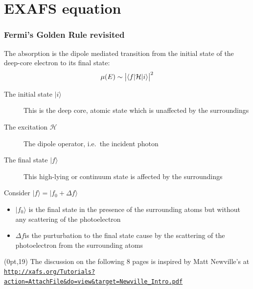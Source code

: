 \documentclass[10pt, xcolor=x11names, compress]{beamer}
\begin{document}
% 
% 


\section{EXAFS equation}


\begin{frame}
  \frametitle{Fermi's Golden Rule revisited}
  The absorption is the dipole mediated transition from the initial
  state of the deep-core electron to its final state:
  \begin{equation}
    \mu(E) \sim \big|\langle f| \mathcal{H}|i\rangle\big|^2
    \notag
  \end{equation}
  \begin{description}
  \item[The initial state $|i\rangle$] This is the deep core, atomic
    state which is unaffected by the surroundings
  \item[The excitation $\mathcal{H}$] The dipole operator, i.e.\ the
    incident photon
  \item[The final state $|f\rangle$] This high-lying or continuum
    state \alert{is} affected by the surroundings
  \end{description}
  \begin{block}{Consider $|f\rangle = |f_0+\Delta f\rangle$}
    \begin{itemize}
    \item $|f_0\rangle$ is the final state in the presence of the
      surrounding atoms but \alert{without} any scattering of the
      photoelectron
    \item $\Delta f$is the purturbation to the final state cause by
      the scattering of the photoelectron from the surrounding atoms
    \end{itemize}
  \end{block}
  \begin{textblock*}{0.6\linewidth}(0pt,19\TPVertModule)%
    \tiny%
    The discussion on the following 8 pages is inspired by Matt
    Newville's at
    \href{http://xafs.org/Tutorials?action=AttachFile&do=view&target=Newville_Intro.pdf}
    {\color{Blue4}\texttt{http://xafs.org/Tutorials?action=AttachFile\&do=view\&target=Newville\_Intro.pdf}}
  \end{textblock*}
\end{frame}
\end{document}
